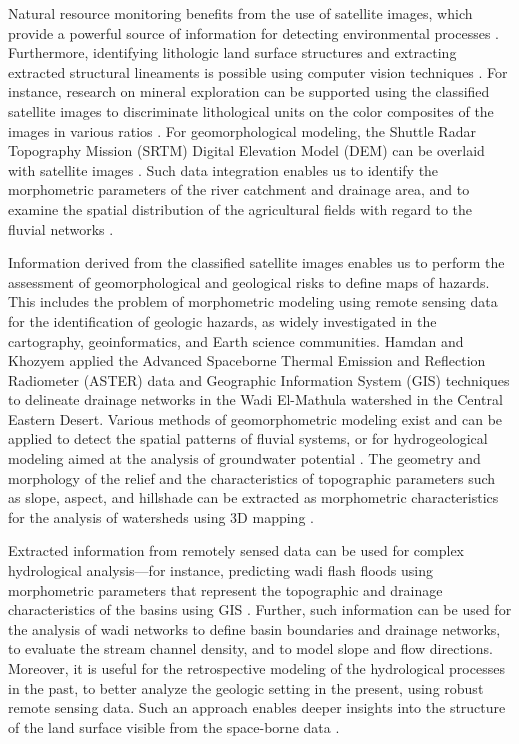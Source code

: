 \documentclass[information,article,accept,pdftex,moreauthors]{Definitions/mdpi}
\begin{document}
Natural resource monitoring benefits from the use of satellite images, which provide a powerful source of information for detecting environmental processes \cite{Khafagy}. {Furthermore}, identifying lithologic land surface structures and extracting extracted structural lineaments is possible using computer vision techniques \cite{Bishta,Kusky,Salman}. For instance, research on mineral exploration can be supported using the classified satellite images to discriminate lithological units on the color composites of the images in various ratios \cite{Shalaby}. For geomorphological modeling, the Shuttle Radar Topography Mission (SRTM) Digital Elevation Model (DEM) can be overlaid with satellite images \cite{Liping}. Such data integration enables us to identify the morphometric parameters of the river catchment and drainage area, and to examine the spatial distribution of the agricultural fields with regard to the fluvial networks \cite{6265340}. 

Information derived from the classified satellite images enables us to perform the assessment of geomorphological and geological risks to define maps of hazards. This includes the problem of morphometric modeling using remote sensing data for the identification of geologic hazards, as widely investigated in the cartography, geoinformatics, and Earth science communities. Hamdan and Khozyem \cite{Hamdan} applied the Advanced Spaceborne Thermal Emission and Reflection Radiometer (ASTER) data and Geographic Information System (GIS) techniques to delineate drainage networks in the Wadi El-Mathula watershed in the Central Eastern Desert. Various methods of geomorphometric modeling exist and can be applied to detect the spatial patterns of fluvial systems, or for hydrogeological modeling aimed at the analysis of groundwater potential \cite{Issawi,Abdalla2020,Gaber}. The geometry and morphology of the relief and the characteristics of topographic parameters such as slope, aspect, and hillshade can be extracted as morphometric characteristics for the analysis of watersheds using 3D mapping \cite{Lemenkova202301}. 

Extracted information from remotely sensed data can be used for complex hydrological analysis---for instance, predicting wadi flash floods using morphometric parameters that represent the topographic and drainage characteristics of the basins using GIS \cite{w9070553}. Further, such information can be used for the analysis of wadi networks to define basin boundaries and drainage networks, to evaluate the stream channel density, and to model slope and flow directions. Moreover, it is useful for the retrospective modeling of the hydrological processes in the past, to better analyze the geologic setting in {the present,} using robust remote sensing data. Such an approach enables deeper insights into the structure of the land surface visible from the {space-borne} data \cite{abdelkareem2013integration,AbdelkareemFarouk}. 
\end{document}
